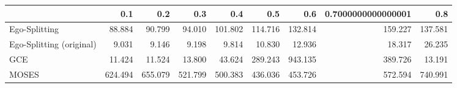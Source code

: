 \begin{tabular}{lrrrrrrrr}
\toprule
{} &     0.1 &     0.2 &     0.3 &     0.4 &     0.5 &     0.6 & 0.7000000000000001 &     0.8 \\
\midrule
Ego-Splitting            &  88.884 &  90.799 &  94.010 & 101.802 & 114.716 & 132.814 &            159.227 & 137.581 \\
Ego-Splitting (original) &   9.031 &   9.146 &   9.198 &   9.814 &  10.830 &  12.936 &             18.317 &  26.235 \\
GCE                      &  11.424 &  11.524 &  13.800 &  43.624 & 289.243 & 943.135 &            389.726 &  13.191 \\
MOSES                    & 624.494 & 655.079 & 521.799 & 500.383 & 436.036 & 453.726 &            572.594 & 740.991 \\
\bottomrule
\end{tabular}
